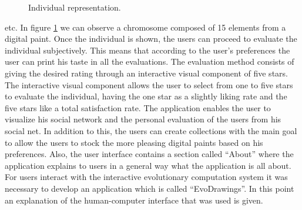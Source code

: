 \begin{figure}
\captionsetup{justification=centering,margin=2cm}
\centering
\setlength\fboxsep{0pt}
\setlength\fboxrule{0.7pt}
\caption{Individual representation.}
\label{fig:graph}       
\end{figure}




etc. In figure \ref{fig:graph} we can observe a chromosome composed of 15 elements from a digital paint. Once the individual is shown, the users can proceed to evaluate the individual subjectively. This means that according to the user's preferences the user can print his taste in all the evaluations.
The evaluation method consists of giving the desired rating through an interactive visual component of five stars. The interactive visual component allows the user to select from one to five stars to evaluate the individual, having the one star as a slightly liking rate and the five stars like a total satisfaction rate. 
The application enables the user to visualize his social network and the personal evaluation of the users from his social net. In addition to this, the users can create collections with the main goal to allow the users to stock the more pleasing digital paints based on his preferences. 
Also, the user interface contains a section called “About” where the application explains to users in a general way what the application is all about.
For users interact with the interactive evolutionary computation system  it was necessary to develop an application which is called “EvoDrawings”. In this point an explanation of the human-computer interface that was used  is given. 

